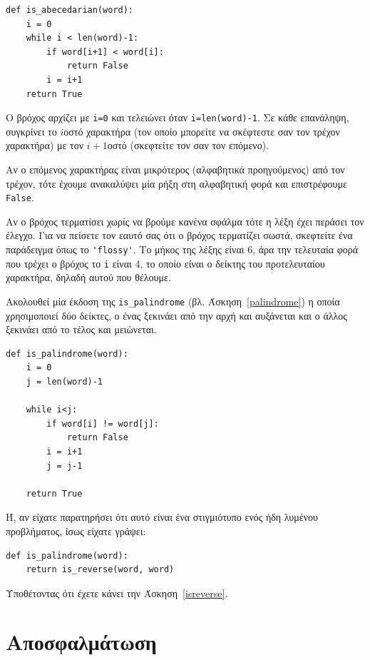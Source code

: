 \documentclass[10pt]{book}
\begin{document}
\begin{verbatim}
def is_abecedarian(word):
    i = 0
    while i < len(word)-1:
        if word[i+1] < word[i]:
            return False
        i = i+1
    return True
\end{verbatim}
%

Ο βρόχος αρχίζει με {\tt i=0} και τελειώνει όταν {\tt i=len(word)-1}. 
Σε κάθε επανάληψη, συγκρίνει το $i$οστό χαρακτήρα (τον οποίο μπορείτε να σκέφτεστε σαν τον τρέχον χαρακτήρα) με τον $i+1$οστό (σκεφτείτε τον σαν τον επόμενο).

Αν ο επόμενος χαρακτήρας είναι μικρότερος (αλφαβητικά προηγούμενος) από τον τρέχον, τότε έχουμε ανακαλύψει μία ρήξη στη αλφαβητική φορά και επιστρέφουμε {\tt False}.

Αν ο βρόχος τερματίσει χωρίς να βρούμε κανένα σφάλμα τότε η λέξη έχει περάσει τον έλεγχο. Για να πείσετε τον εαυτό σας ότι ο βρόχος τερματίζει σωστά, σκεφτείτε ένα παράδειγμα όπως το \verb"'flossy'". Το μήκος της λέξης είναι 6, άρα την τελευταία φορά που τρέχει ο βρόχος το {\tt i} είναι 4, το οποίο είναι ο δείκτης του προτελευταίου χαρακτήρα, δηλαδή αυτού που θέλουμε.

Ακολουθεί μία έκδοση της \verb"is_palindrome" (βλ. Άσκηση~\ref{palindrome}) η οποία χρησιμοποιεί δύο δείκτες, ο ένας ξεκινάει από την αρχή και αυξάνεται και ο άλλος ξεκινάει από το τέλος και μειώνεται.


\begin{verbatim}
def is_palindrome(word):
    i = 0
    j = len(word)-1
    
    while i<j:
        if word[i] != word[j]:
            return False
        i = i+1
        j = j-1

    return True
\end{verbatim}


Ή, αν είχατε παρατηρήσει ότι αυτό είναι ένα στιγμιότυπο ενός ήδη λυμένου προβλήματος, ίσως είχατε γράψει:

\begin{verbatim}
def is_palindrome(word):
    return is_reverse(word, word)
\end{verbatim}

Υποθέτοντας ότι έχετε κάνει την Άσκηση~\ref{isreverse}.



\section{Αποσφαλμάτωση}
\end{document}
